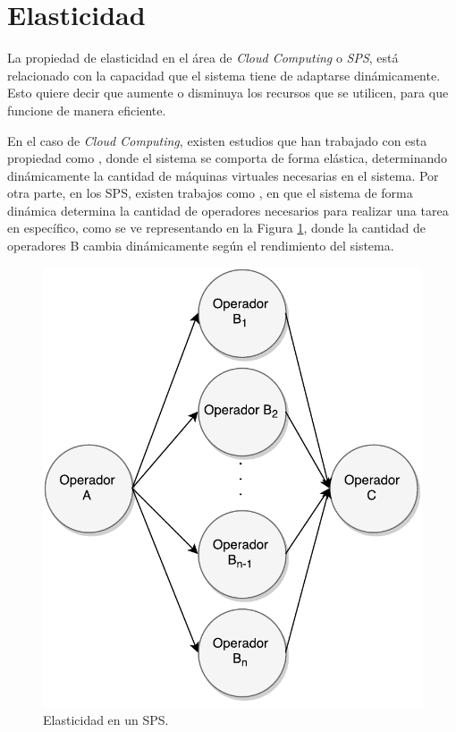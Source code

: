 \section{Elasticidad}
\label{sec:elasticidad}

La propiedad de elasticidad en el área de \textit{Cloud Computing} o \textit{SPS}, está relacionado con la capacidad que el sistema tiene de adaptarse dinámicamente. Esto quiere decir que aumente o disminuya los recursos que se utilicen, para que funcione de manera eficiente.

En el caso de \textit{Cloud Computing}, existen estudios que han trabajado con esta propiedad como \citep{GongGW10, NguyenSGSW13, LehrigEB15}, donde el sistema se comporta de forma elástica, determinando dinámicamente la cantidad de máquinas virtuales necesarias en el sistema. Por otra parte, en los SPS, existen trabajos como \citep{GedikSHW14, IshiiS11, SchneiderAGBW09, MadsenTZ14, GulisanoJPSV12}, en que el sistema de forma dinámica determina la cantidad de operadores necesarios para realizar una tarea en específico, como se ve representando en la Figura \ref{fig:elasticidad}, donde la cantidad de operadores B cambia dinámicamente según el rendimiento del sistema.

\begin{figure}[!ht]
	\centering
	\includegraphics[scale=0.55]{images/Elasticidad.pdf}
	\caption{Elasticidad en un SPS.}
	\label{fig:elasticidad}
\end{figure}

